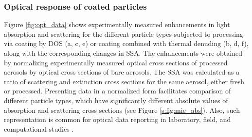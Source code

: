\documentclass[12pt,authoryear]{elsarticle}
\begin{document}
\subsubsection{Optical response of coated particles}

Figure \ref{fig:opt_data} shows experimentally measured enhancements in light absorption and scattering for the different particle types subjected to processing via coating by DOS (a, c, e) or coating combined with thermal denuding (b, d, f), along with the corresponding changes in SSA. The enhancements were obtained by normalizing experimentally measured optical cross sections of processed aerosols by optical cross sections of bare aerosols. The SSA was calculated as a ratio of scattering and extinction cross sections for the same aerosol, either fresh or processed. Presenting data in a normalized form facilitates comparison of different particle types, which have significantly different absolute values of absorption and scattering cross sections (see Figure \ref{s:fig:mie_abs}). Also, such representation is common for optical data reporting in laboratory, field, and computational studies \citep{RN7,RN52,RN22}.
\end{document}
